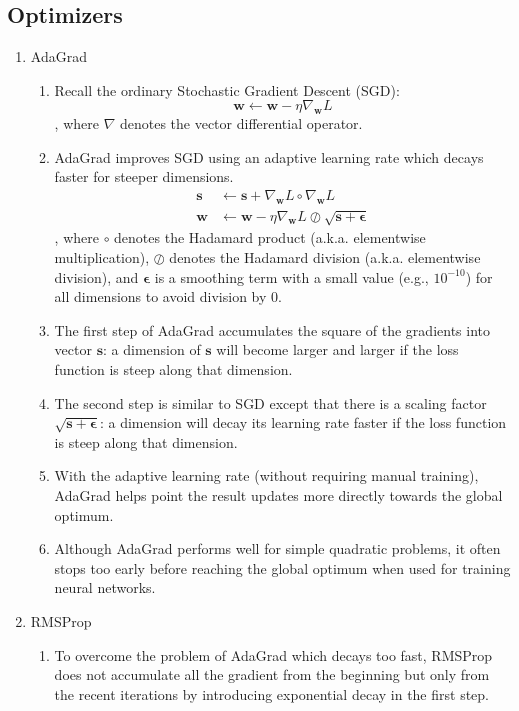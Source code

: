 \documentclass[11pt]{article}
\begin{document}
\subsection{Optimizers}
\begin{enumerate}
    \item AdaGrad
    \begin{enumerate}
        \item Recall the ordinary Stochastic Gradient Descent (SGD): $$\mathbf{w} \gets \mathbf{w} - \eta \nabla_{\mathbf{w}} L$$, where $\nabla$ denotes the vector differential operator. 
        \item AdaGrad improves SGD using an adaptive learning rate which decays faster for steeper dimensions.
        \begin{align*}
            \mathbf{s} &\gets \mathbf{s} + \nabla_{\mathbf{w}} L \circ \nabla_{\mathbf{w}} L\\
            \mathbf{w} &\gets \mathbf{w} - \eta \nabla_{\mathbf{w}} L \oslash \sqrt{\mathbf{s + \epsilon}}
        \end{align*}, where $\circ$ denotes the Hadamard product (a.k.a. elementwise multiplication), $\oslash$ denotes the Hadamard division (a.k.a. elementwise division), and $\mathbf{\epsilon}$ is a smoothing term with a small value (e.g., $10^{-10}$) for all dimensions to avoid division by $0$.
        \item The first step of AdaGrad accumulates the square of the gradients into vector $\mathbf{s}$: a dimension of $\mathbf{s}$ will become larger and larger if the loss function is steep along that dimension.
        \item The second step is similar to SGD except that there is a scaling factor $\sqrt{\mathbf{s + \epsilon}}$: a dimension will decay its learning rate faster if the loss function is steep along that dimension. 
        \item With the adaptive learning rate (without requiring manual training), AdaGrad helps point the result updates more directly towards the global optimum.
        \item Although AdaGrad performs well for simple quadratic problems, it often stops too early before reaching the global optimum when used for training neural networks.
    \end{enumerate}
    \item RMSProp
    \begin{enumerate}
        \item To overcome the problem of AdaGrad which decays too fast, RMSProp does not accumulate all the gradient from the beginning but only from the recent iterations by introducing exponential decay in the first step. 

\end{enumerate}
\end{enumerate}
\end{document}
